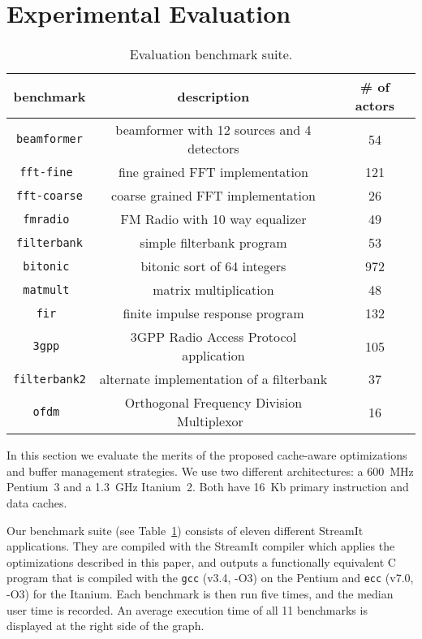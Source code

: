 \section{Experimental Evaluation}
\label{sec:evaluation}

\begin{table}[t]
\center
\label{tab:benchmarks}
\vspace{-12pt}
{\tiny
\begin{tabular}{|c|c|c|} \hline
{\bf benchmark}&{\bf description}&{\bf \# of actors}\\ \hline \hline
\texttt{beamformer} &beamformer with 12 sources and 4 detectors& 54 \\ \hline
\texttt{fft-fine	} &fine grained FFT implementation	&	121 \\ \hline
\texttt{fft-coarse} &coarse grained FFT implementation	&	26 \\ \hline
\texttt{fmradio	} &FM Radio with 10 way equalizer	&	49 \\ \hline
\texttt{filterbank} &simple filterbank program	&	53 \\ \hline
\texttt{bitonic	} &bitonic sort of 64 integers	&	972 \\ \hline
\texttt{matmult	} &matrix multiplication	&	48 \\ \hline
\texttt{fir	      } &finite impulse response program	&	132 \\ \hline
\texttt{3gpp	} &3GPP Radio Access Protocol application	&	105 \\ \hline
\texttt{filterbank2}&alternate implementation of a filterbank &	37 \\ \hline
\texttt{ofdm	 }& Orthogonal Frequency Division Multiplexor~\cite{spectrumware}	&	16 \\ \hline
\end{tabular}
}
\vspace{-12pt}
\caption{Evaluation benchmark suite.}
\end{table}


In this section we evaluate the merits of the proposed cache-aware
optimizations and buffer management strategies. We use two
different architectures: a 600~MHz Pentium~3 and a 1.3~GHz
Itanium~2. Both have 16~Kb primary instruction and data caches.

Our benchmark suite (see Table~\ref{tab:benchmarks}) consists of eleven
different StreamIt applications. They are compiled with the StreamIt
compiler which applies the optimizations described in this paper, and
outputs a functionally equivalent C program that is compiled with the
\texttt{gcc} (v3.4, -O3) on the Pentium and \texttt{ecc} 
(v7.0, -O3) for the Itanium. Each benchmark is
then run five times, and the median user time is recorded.
An average execution time of all 11 benchmarks is displayed 
at the right side of the graph.

